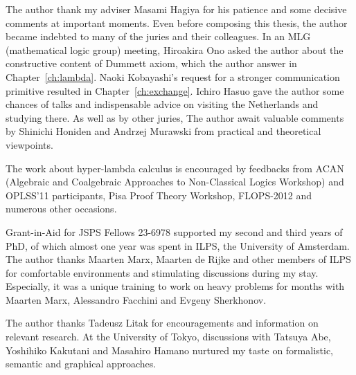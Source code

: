 \begin{acknowledge}
 The author thank my adviser Masami Hagiya for his patience and some decisive
 comments at important moments.
 Even before composing this thesis, the author became indebted to many of the
 juries and their colleagues.
 In an MLG (mathematical logic group) meeting, Hiroakira Ono asked the author
 about the constructive content of Dummett axiom, which the author answer in
 Chapter~\ref{ch:lambda}.
 Naoki Kobayashi's request for a stronger communication primitive
 resulted in Chapter~\ref{ch:exchange}.
 Ichiro Hasuo gave the author some chances of talks and
 indispensable advice on visiting the Netherlands
 and studying there.
 As well as by other juries,
 The author await valuable comments by Shinichi Honiden and Andrzej Murawski from
 practical and theoretical viewpoints.

 The work about hyper-lambda calculus is encouraged by feedbacks from
 ACAN (Algebraic and Coalgebraic Approaches to
 Non-Classical Logics Workshop) and OPLSS'11 participants,
 Pisa Proof Theory Workshop, FLOPS-2012
 and numerous other occasions.

 Grant-in-Aid for JSPS Fellows 23-6978 supported
 my second and third years of PhD, of which almost one year was spent
 in ILPS, the University of Amsterdam.
 The author thanks Maarten Marx, Maarten de Rijke and other members of ILPS for
 comfortable environments and stimulating discussions during my stay.
 Especially, it was a unique training to work on heavy problems for months with Maarten Marx, Alessandro
 Facchini and Evgeny Sherkhonov.

 The author thanks Tadeusz Litak for encouragements and
 information on relevant research.
 At the University of Tokyo,
 discussions with Tatsuya Abe, Yoshihiko Kakutani and Masahiro Hamano
 nurtured my taste on formalistic, semantic and graphical approaches.
\end{acknowledge}

